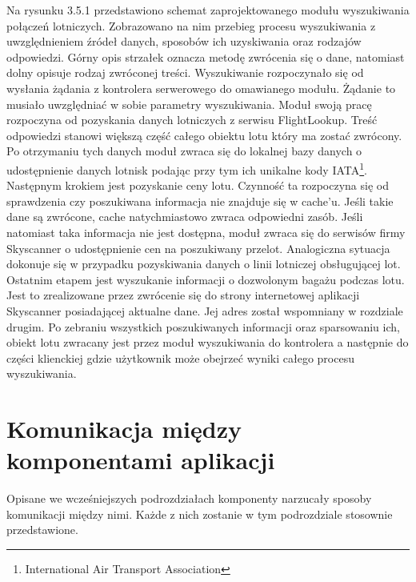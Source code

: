 \documentclass[12pt, twoside]{report}
\begin{document}
Na rysunku 3.5.1 przedstawiono schemat zaprojektowanego modułu wyszukiwania połączeń lotniczych. Zobrazowano na nim przebieg procesu wyszukiwania z uwzględnieniem źródeł danych, sposobów ich uzyskiwania oraz rodzajów odpowiedzi. Górny opis strzałek oznacza metodę zwrócenia się o dane, natomiast dolny opisuje rodzaj zwróconej treści. Wyszukiwanie rozpoczynało się od wysłania żądania z kontrolera serwerowego do omawianego modułu. Żądanie to musiało uwzględniać w sobie parametry wyszukiwania. Moduł swoją pracę rozpoczyna od pozyskania danych lotniczych z serwisu FlightLookup. Treść odpowiedzi stanowi większą część całego obiektu lotu który ma zostać zwrócony. Po otrzymaniu tych danych moduł zwraca się do lokalnej bazy danych o udostępnienie danych lotnisk podając przy tym ich unikalne kody IATA\footnote{International Air Transport Association}. Następnym krokiem jest pozyskanie ceny lotu. Czynność ta rozpoczyna się od sprawdzenia czy poszukiwana informacja nie znajduje się w cache'u. Jeśli takie dane są zwrócone, cache natychmiastowo zwraca odpowiedni zasób. Jeśli natomiast taka informacja nie jest dostępna, moduł zwraca się do serwisów firmy Skyscanner o udostępnienie cen na poszukiwany przelot. Analogiczna sytuacja dokonuje się w przypadku pozyskiwania danych o linii lotniczej obsługującej lot. Ostatnim etapem jest wyszukanie informacji o dozwolonym bagażu podczas lotu. Jest to zrealizowane przez zwrócenie się do strony internetowej aplikacji Skyscanner posiadającej aktualne dane. Jej adres został wspomniany w rozdziale drugim. Po zebraniu wszystkich poszukiwanych informacji oraz sparsowaniu ich, obiekt lotu zwracany jest przez moduł wyszukiwania do kontrolera a następnie do części klienckiej gdzie użytkownik może obejrzeć wyniki całego procesu wyszukiwania.
\section{Komunikacja między komponentami aplikacji}
Opisane we wcześniejszych podrozdziałach komponenty narzucały sposoby komunikacji między nimi. Każde z nich zostanie w tym podrozdziale stosownie przedstawione. 
\end{document}
